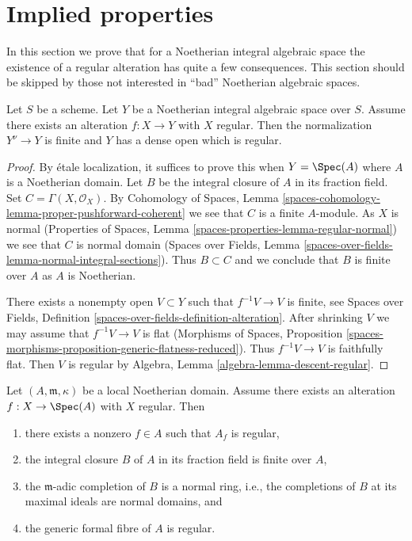 \section{Implied properties}
\label{section-existence-gives}

\noindent
In this section we prove that for a Noetherian integral algebraic space
the existence of a regular alteration has quite a few consequences.
This section should be skipped by those not interested in ``bad''
Noetherian algebraic spaces.

\begin{lemma}
\label{lemma-regular-alteration-implies}
Let $S$ be a scheme. Let $Y$ be a Noetherian integral algebraic space
over $S$. Assume there exists an alteration
$f : X \to Y$ with $X$ regular. Then the normalization $Y^\nu \to Y$
is finite and $Y$ has a dense open which is regular.
\end{lemma}

\begin{proof}
By \'etale localization, it suffices to prove this when
$Y = \Spec(A)$ where $A$ is a Noetherian domain.
Let $B$ be the integral closure of $A$ in its fraction field.
Set $C = \Gamma(X, \mathcal{O}_X)$. By
Cohomology of Spaces, Lemma
\ref{spaces-cohomology-lemma-proper-pushforward-coherent}
we see that $C$ is a finite $A$-module.
As $X$ is normal
(Properties of Spaces, Lemma
\ref{spaces-properties-lemma-regular-normal})
we see that $C$ is normal domain
(Spaces over Fields, Lemma
\ref{spaces-over-fields-lemma-normal-integral-sections}).
Thus $B \subset C$ and we conclude that $B$ is finite over $A$
as $A$ is Noetherian.

\medskip\noindent
There exists a nonempty open $V \subset Y$ such that $f^{-1}V \to V$
is finite, see Spaces over Fields, Definition
\ref{spaces-over-fields-definition-alteration}.
After shrinking $V$ we may assume that $f^{-1}V \to V$ is flat
(Morphisms of Spaces, Proposition
\ref{spaces-morphisms-proposition-generic-flatness-reduced}).
Thus $f^{-1}V \to V$ is faithfully flat. Then $V$ is regular by
Algebra, Lemma \ref{algebra-lemma-descent-regular}.
\end{proof}

\begin{lemma}
\label{lemma-regular-alteration-implies-local}
Let $(A, \mathfrak m, \kappa)$ be a local Noetherian domain.
Assume there exists an alteration $f : X \to \Spec(A)$
with $X$ regular. Then
\begin{enumerate}
\item there exists a nonzero $f \in A$ such that $A_f$ is regular,
\item the integral closure $B$ of $A$ in its fraction field is finite over $A$,
\item the $\mathfrak m$-adic completion of $B$ is a normal ring, i.e., the
completions of $B$ at its maximal ideals are normal domains, and
\item the generic formal fibre of $A$ is regular.
\end{enumerate}
\end{lemma}

